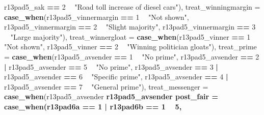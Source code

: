 \documentclass[]{book}
\newenvironment{Shaded}{\begin{snugshade}}{\end{snugshade}}
\newcommand{\KeywordTok}[1]{\textcolor[rgb]{0.13,0.29,0.53}{\textbf{#1}}}
\newcommand{\DataTypeTok}[1]{\textcolor[rgb]{0.13,0.29,0.53}{#1}}
\newcommand{\DecValTok}[1]{\textcolor[rgb]{0.00,0.00,0.81}{#1}}
\newcommand{\StringTok}[1]{\textcolor[rgb]{0.31,0.60,0.02}{#1}}
\newcommand{\OperatorTok}[1]{\textcolor[rgb]{0.81,0.36,0.00}{\textbf{#1}}}
\newcommand{\NormalTok}[1]{#1}
\begin{document}
\begin{Shaded}
\begin{Highlighting}[]
{{{{{\NormalTok{                               r13pad5_sak }\OperatorTok{==}\StringTok{ }\DecValTok{2} \OperatorTok{~}\StringTok{ "Road toll increase of diesel cars"}\NormalTok{),}
         \DataTypeTok{treat_winningmargin =} \KeywordTok{case_when}\NormalTok{(r13pad5_vinnermargin }\OperatorTok{==}\StringTok{ }\DecValTok{1} \OperatorTok{~}\StringTok{ "Not shown"}\NormalTok{,}
\NormalTok{                                       r13pad5_vinnermargin }\OperatorTok{==}\StringTok{ }\DecValTok{2} \OperatorTok{~}\StringTok{ "Slight majority"}\NormalTok{,}
\NormalTok{                                       r13pad5_vinnermargin }\OperatorTok{==}\StringTok{ }\DecValTok{3} \OperatorTok{~}\StringTok{ "Large majority"}\NormalTok{),}
         \DataTypeTok{treat_winnergloat =} \KeywordTok{case_when}\NormalTok{(r13pad5_vinner }\OperatorTok{==}\StringTok{ }\DecValTok{1} \OperatorTok{~}\StringTok{ "Not shown"}\NormalTok{,}
\NormalTok{                                     r13pad5_vinner }\OperatorTok{==}\StringTok{ }\DecValTok{2} \OperatorTok{~}\StringTok{ "Winning politician gloats"}\NormalTok{),}
        \DataTypeTok{treat_prime =} \KeywordTok{case_when}\NormalTok{(r13pad5_avsender }\OperatorTok{==}\StringTok{ }\DecValTok{1} \OperatorTok{~}\StringTok{ "No prime"}\NormalTok{,}
\NormalTok{                               r13pad5_avsender }\OperatorTok{==}\StringTok{ }\DecValTok{2}  \OperatorTok{|}\StringTok{ }\NormalTok{r13pad5_avsender }\OperatorTok{==}\StringTok{ }\DecValTok{5} \OperatorTok{~}\StringTok{ "No prime"}\NormalTok{,}
\NormalTok{                               r13pad5_avsender }\OperatorTok{==}\StringTok{ }\DecValTok{3}  \OperatorTok{|}\StringTok{ }\NormalTok{r13pad5_avsender }\OperatorTok{==}\StringTok{ }\DecValTok{6} \OperatorTok{~}\StringTok{ "Specific prime"}\NormalTok{,}
\NormalTok{                               r13pad5_avsender }\OperatorTok{==}\StringTok{ }\DecValTok{4} \OperatorTok{|}\StringTok{ }\NormalTok{r13pad5_avsender }\OperatorTok{==}\StringTok{ }\DecValTok{7} \OperatorTok{~}\StringTok{ "General prime"}\NormalTok{),}
         \DataTypeTok{treat_messenger =} \KeywordTok{case_when}\NormalTok{(r13pad5_avsender }\OperatorTok{%in%}\StringTok{ }\DecValTok{2}\OperatorTok{:}\DecValTok{4} \OperatorTok{~}\StringTok{ "Political leader"}\NormalTok{,}
\NormalTok{                                   r13pad5_avsender }\OperatorTok{%in%}\StringTok{ }\DecValTok{6}\OperatorTok{:}\DecValTok{7} \OperatorTok{~}\StringTok{ "Local newspaper"}\NormalTok{),}
         \DataTypeTok{post_fair =} \KeywordTok{case_when}\NormalTok{(r13pad6a }\OperatorTok{==}\StringTok{ }\DecValTok{1} \OperatorTok{|}\StringTok{ }\NormalTok{r13pad6b }\OperatorTok{==}\StringTok{ }\DecValTok{1} \OperatorTok{~}\StringTok{ }\DecValTok{5}\NormalTok{,}
}}}}}}}
\end{Highlighting}
\end{Shaded}
\end{document}
